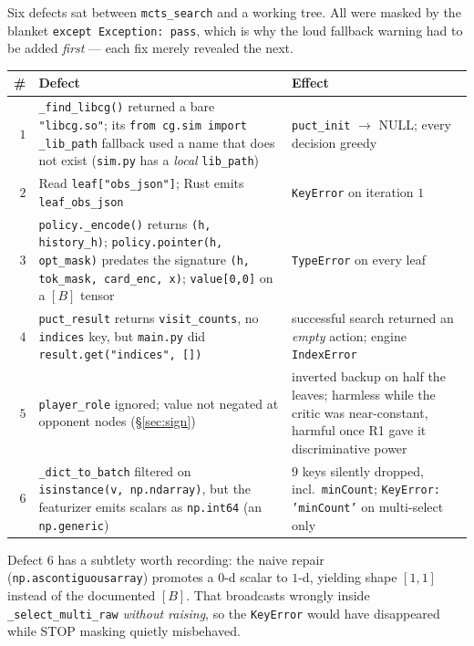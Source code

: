\documentclass[11pt,a4paper]{article}
\newcommand{\code}[1]{\texttt{\small #1}}
\begin{document}
Six defects sat between \code{mcts\_search} and a working tree. All were
masked by the blanket \code{except Exception: pass}, which is why the loud
fallback warning had to be added \emph{first} --- each fix merely revealed the
next.

\begin{center}
\begin{longtable}{@{}rp{6.6cm}p{5.4cm}@{}}
\toprule
\textbf{\#} & \textbf{Defect} & \textbf{Effect} \\
\midrule
\endhead
$1$ & \code{\_find\_libcg()} returned a bare \code{"libcg.so"}; its
      \code{from cg.sim import \_lib\_path} fallback used a name that does not
      exist (\code{sim.py} has a \emph{local} \code{lib\_path})
    & \code{puct\_init} $\to$ NULL; every decision greedy \\
\addlinespace
$2$ & Read \code{leaf["obs\_json"]}; Rust emits \code{leaf\_obs\_json}
    & \code{KeyError} on iteration $1$ \\
\addlinespace
$3$ & \code{policy.\_encode()} returns \code{(h, history\_h)};
      \code{policy.pointer(h, opt\_mask)} predates the signature
      \code{(h, tok\_mask, card\_enc, x)}; \code{value[0,0]} on a $[B]$ tensor
    & \code{TypeError} on every leaf \\
\addlinespace
$4$ & \code{puct\_result} returns \code{visit\_counts}, no \code{indices} key,
      but \code{main.py} did \code{result.get("indices", [])}
    & successful search returned an \emph{empty} action; engine
      \code{IndexError} \\
\addlinespace
$5$ & \code{player\_role} ignored; value not negated at opponent nodes
      (\S\ref{sec:sign})
    & inverted backup on half the leaves; harmless while the critic was
      near-constant, harmful once R1 gave it discriminative power \\
\addlinespace
$6$ & \code{\_dict\_to\_batch} filtered on \code{isinstance(v, np.ndarray)},
      but the featurizer emits scalars as \code{np.int64} (an
      \code{np.generic})
    & $9$ keys silently dropped, incl.\ \code{minCount};
      \code{KeyError: 'minCount'} on multi-select only \\
\bottomrule
\end{longtable}
\end{center}

\noindent
Defect $6$ has a subtlety worth recording: the naive repair
(\code{np.ascontiguousarray}) promotes a $0$-d scalar to $1$-d, yielding shape
$[1,1]$ instead of the documented $[B]$. That broadcasts wrongly inside
\code{\_select\_multi\_raw} \emph{without raising}, so the \code{KeyError}
would have disappeared while STOP masking quietly misbehaved.
\end{document}
